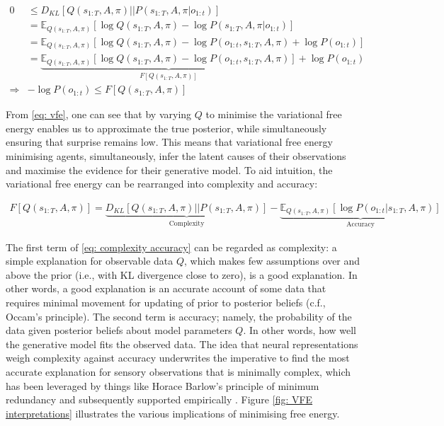 \documentclass[review,12pt,authoryear]{elsarticle}
\newcommand{\E}{\mathbb E}
\begin{document}
  	\begin{equation}
  	\label{eq: vfe}
  	    \begin{split}
  	        0 &\leq D_{KL}[Q(s_{1:T}, A, \pi)||P(s_{1:T}, A, \pi |o_{1:t})] \\
  	        &= \E_{Q(s_{1:T}, A, \pi)}[\log Q(s_{1:T}, A, \pi) - \log P(s_{1:T}, A, \pi |o_{1:t})] \\
  	        &= \E_{Q(s_{1:T}, A, \pi)}[\log Q(s_{1:T}, A, \pi) - \log P(o_{1:t},s_{1:T}, A, \pi) + \log P(o_{1:t})] \\
  	        &= \underbrace{\E_{Q(s_{1:T}, A, \pi)}[\log Q(s_{1:T}, A, \pi) - \log P(o_{1:t},s_{1:T}, A, \pi)]}_{F[Q(s_{1:T}, A, \pi)]} + \log P(o_{1:t}) \\
  	        \Rightarrow & -\log P(o_{1:t}) \leq F[Q(s_{1:T}, A, \pi)]
  	    \end{split}
  	\end{equation}
  	
From \eqref{eq: vfe}, one can see that by varying $Q$ to minimise the variational free energy enables us to approximate the true posterior, while simultaneously ensuring that surprise remains low. This means that variational free energy minimising agents, simultaneously, infer the latent causes of their observations and maximise the evidence for their generative model.
To aid intuition, the variational free energy can be rearranged into complexity and accuracy:

  	\begin{multline}
  	\label{eq: complexity accuracy}
  	    F[Q(s_{1:T}, A, \pi)] = \underbrace{D_{KL}[Q(s_{1:T}, A, \pi)||P(s_{1:T}, A, \pi)]}_{\text{Complexity}}-\underbrace{\E_{Q(s_{1:T}, A, \pi)}[\log P(o_{1:t}|s_{1:T}, A, \pi)]}_{\text{Accuracy}}
  	\end{multline}
  	
The first term of \eqref{eq: complexity accuracy} can be regarded as complexity: a simple explanation for observable data $Q$, which makes few assumptions over and above the prior (i.e., with KL divergence close to zero), is a good explanation. In other words, a good explanation is an accurate account of some data that requires minimal movement for updating of prior to posterior beliefs (c.f., Occam's principle). The second term is accuracy; namely, the probability of the data given posterior beliefs about model parameters $Q$. In other words, how well the generative model fits the observed data. The idea that neural representations weigh complexity against accuracy underwrites the imperative to find the most accurate explanation for sensory observations that is minimally complex, which has been leveraged by things like Horace Barlow’s principle of minimum redundancy \citep{barlowRedundancyReductionRevisited2001} and subsequently supported empirically \citep{danEfficientCodingNatural1996,lewickiEfficientCodingNatural2002,olshausenSparseCodingSensory2004,olshausenNewWindowSound2002}. Figure \ref{fig: VFE interpretations} illustrates the various implications of minimising free energy.
\end{document}
